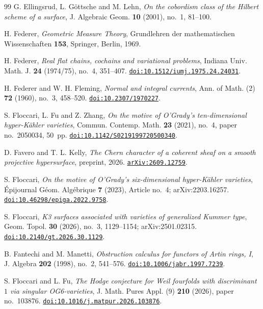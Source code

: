 \begin{thebibliography}{99}
G. Ellingsrud, L. G\"ottsche and M. Lehn,
\emph{On the cobordism class of the Hilbert scheme of a surface},
J. Algebraic Geom. \textbf{10} (2001), no.~1, 81--100.

H. Federer,
\emph{Geometric Measure Theory},
Grundlehren der mathematischen Wissenschaften \textbf{153},
Springer, Berlin, 1969.

H. Federer,
\emph{Real flat chains, cochains and variational problems},
Indiana Univ. Math. J. \textbf{24} (1974/75), no.~4, 351--407.
\href{https://doi.org/10.1512/iumj.1975.24.24031}{\texttt{doi:10.1512/iumj.1975.24.24031}}.

H. Federer and W. H. Fleming,
\emph{Normal and integral currents},
Ann. of Math. (2) \textbf{72} (1960), no.~3, 458--520.
\href{https://doi.org/10.2307/1970227}{\texttt{doi:10.2307/1970227}}.

S. Floccari, L. Fu and Z. Zhang,
\emph{On the motive of O'Grady's ten-dimensional hyper-K\"ahler varieties},
Commun. Contemp. Math. \textbf{23} (2021), no.~4, paper no.~2050034,
50~pp.
\href{https://doi.org/10.1142/S0219199720500340}{\texttt{doi:10.1142/S0219199720500340}}.

D. Favero and T. L. Kelly,
\emph{The Chern character of a coherent sheaf on a smooth projective
hypersurface},
preprint, 2026.
\href{https://arxiv.org/abs/2609.12759}{\texttt{arXiv:2609.12759}}.

S. Floccari,
\emph{On the motive of O'Grady's six-dimensional hyper-K\"ahler varieties},
\'Epijournal G\'eom. Alg\'ebrique \textbf{7} (2023), Article no.~4;
arXiv:2203.16257.
\href{https://doi.org/10.46298/epiga.2022.9758}{\texttt{doi:10.46298/epiga.2022.9758}}.

S. Floccari,
\emph{K3 surfaces associated with varieties of generalized Kummer type},
Geom. Topol. \textbf{30} (2026), no.~3, 1129--1154; arXiv:2501.02315.
\href{https://doi.org/10.2140/gt.2026.30.1129}{\texttt{doi:10.2140/gt.2026.30.1129}}.

B. Fantechi and M. Manetti,
\emph{Obstruction calculus for functors of Artin rings, I},
J. Algebra \textbf{202} (1998), no.~2, 541--576.
\href{https://doi.org/10.1006/jabr.1997.7239}{\texttt{doi:10.1006/jabr.1997.7239}}.

S. Floccari and L. Fu,
\emph{The Hodge conjecture for Weil fourfolds with discriminant $1$ via
singular OG6-varieties},
J. Math. Pures Appl. (9) \textbf{210} (2026), paper no.~103876.
\href{https://doi.org/10.1016/j.matpur.2026.103876}{\texttt{doi:10.1016/j.matpur.2026.103876}}.


\end{thebibliography}
